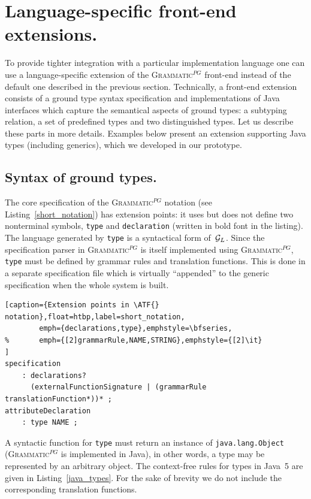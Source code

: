 \documentclass{informat} %
\newcommand{\lstref}[1]{Listing~\ref{#1}}
\newcommand{\ATF}{\textsc{Grammatic}$^{PG}$}
\begin{document}
\section{Language-specific front-end extensions.}\label{Java}

To provide tighter integration with a particular implementation language one can use a language-specific extension of the \ATF{} front-end instead of the default one described in the previous section. 
Technically, a front-end extension consists of a ground type syntax specification and implementations of Java interfaces which capture the semantical aspects of ground types: a subtyping relation, a set of predefined types and two distinguished types. Let us describe these parts in more details.
Examples below present an extension supporting Java types (including generics), which we developed in our prototype.

\subsection{Syntax of ground types.}

The core specification of the \ATF{} notation (see \lstref{short_notation}) has extension points: it uses but does not define two nonterminal symbols, \texttt{type} and \texttt{declaration} (written in bold font in the listing). The language generated by \texttt{type} is a syntactical form of~${\mathcal{G}_L}$. Since the specification parser in \ATF{} is itself implemented using \ATF{}, \texttt{type} must be defined by grammar rules and translation functions. This is done in a separate specification file which is virtually ``appended'' to the generic specification when the whole system is built.
\begin{lstlisting}[caption={Extension points in \ATF{} notation},float=htbp,label=short_notation,
		emph={declarations,type},emphstyle=\bfseries,
%		emph={[2]grammarRule,NAME,STRING},emphstyle={[2]\it}
]
specification 
	: declarations? 
	  (externalFunctionSignature | (grammarRule translationFunction*))* ;
attributeDeclaration 
	: type NAME ;
\end{lstlisting}

A syntactic function for \texttt{type} must return an instance of \texttt{java.lang.Object} (\ATF{} is implemented in Java), in other words, a type may be represented by an arbitrary object. The context-free rules for types in Java~5 are given in \lstref{java_types}. For the sake of brevity we do not include the corresponding translation functions.
\end{document}
